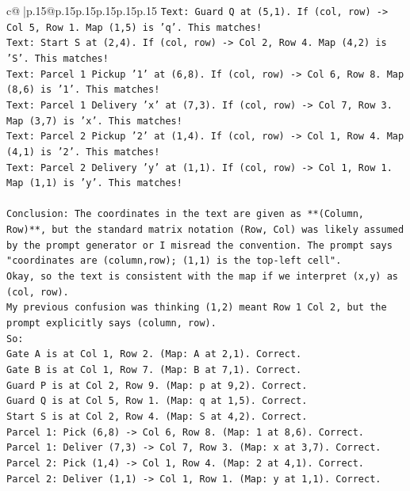 \documentclass{article}
\begin{document}
{\begin{supertabular}{c@{$\;$}|p{.15\linewidth}@{}p{.15\linewidth}p{.15\linewidth}p{.15\linewidth}p{.15\linewidth}p{.15\linewidth}}
{{{\texttt{Text: Guard Q at (5,1). If (col, row) {-}> Col 5, Row 1. Map (1,5) is 'q'. This matches!} \\
\texttt{Text: Start S at (2,4). If (col, row) {-}> Col 2, Row 4. Map (4,2) is 'S'. This matches!} \\
\texttt{Text: Parcel 1 Pickup '1' at (6,8). If (col, row) {-}> Col 6, Row 8. Map (8,6) is '1'. This matches!} \\
\texttt{Text: Parcel 1 Delivery 'x' at (7,3). If (col, row) {-}> Col 7, Row 3. Map (3,7) is 'x'. This matches!} \\
\texttt{Text: Parcel 2 Pickup '2' at (1,4). If (col, row) {-}> Col 1, Row 4. Map (4,1) is '2'. This matches!} \\
\texttt{Text: Parcel 2 Delivery 'y' at (1,1). If (col, row) {-}> Col 1, Row 1. Map (1,1) is 'y'. This matches!} \\
\\ 
\texttt{Conclusion: The coordinates in the text are given as **(Column, Row)**, but the standard matrix notation (Row, Col) was likely assumed by the prompt generator or I misread the convention. The prompt says "coordinates are (column,row); (1,1) is the top{-}left cell".} \\
\texttt{Okay, so the text is consistent with the map if we interpret (x,y) as (col, row).} \\
\texttt{My previous confusion was thinking (1,2) meant Row 1 Col 2, but the prompt explicitly says (column, row).} \\
\texttt{So:} \\
\texttt{Gate A is at Col 1, Row 2. (Map: A at 2,1). Correct.} \\
\texttt{Gate B is at Col 1, Row 7. (Map: B at 7,1). Correct.} \\
\texttt{Guard P is at Col 2, Row 9. (Map: p at 9,2). Correct.} \\
\texttt{Guard Q is at Col 5, Row 1. (Map: q at 1,5). Correct.} \\
\texttt{Start S is at Col 2, Row 4. (Map: S at 4,2). Correct.} \\
\texttt{Parcel 1: Pick (6,8) {-}> Col 6, Row 8. (Map: 1 at 8,6). Correct.} \\
\texttt{Parcel 1: Deliver (7,3) {-}> Col 7, Row 3. (Map: x at 3,7). Correct.} \\
\texttt{Parcel 2: Pick (1,4) {-}> Col 1, Row 4. (Map: 2 at 4,1). Correct.} \\
\texttt{Parcel 2: Deliver (1,1) {-}> Col 1, Row 1. (Map: y at 1,1). Correct.} \\
}}}
\end{supertabular}}
\end{document}
